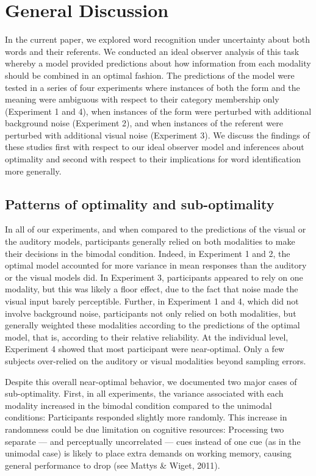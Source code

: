 \documentclass[english,,man,floatsintext]{apa6}
\theoremstyle{definition}
\theoremstyle{definition}
\theoremstyle{definition}
\theoremstyle{remark}
\begin{document}
\section{General Discussion}\label{general-discussion}

In the current paper, we explored word recognition under uncertainty
about both words and their referents. We conducted an ideal observer
analysis of this task whereby a model provided predictions about how
information from each modality should be combined in an optimal fashion.
The predictions of the model were tested in a series of four experiments
where instances of both the form and the meaning were ambiguous with
respect to their category membership only (Experiment 1 and 4), when
instances of the form were perturbed with additional background noise
(Experiment 2), and when instances of the referent were perturbed with
additional visual noise (Experiment 3). We discuss the findings of these
studies first with respect to our ideal observer model and inferences
about optimality and second with respect to their implications for word
identification more generally.

\subsection{Patterns of optimality and
sub-optimality}\label{patterns-of-optimality-and-sub-optimality}

In all of our experiments, and when compared to the predictions of the
visual or the auditory models, participants generally relied on both
modalities to make their decisions in the bimodal condition. Indeed, in
Experiment 1 and 2, the optimal model accounted for more variance in
mean responses than the auditory or the visual models did. In Experiment
3, participants appeared to rely on one modality, but this was likely a
floor effect, due to the fact that noise made the visual input barely
perceptible. Further, in Experiment 1 and 4, which did not involve
background noise, participants not only relied on both modalities, but
generally weighted these modalities according to the predictions of the
optimal model, that is, according to their relative reliability. At the
individual level, Experiment 4 showed that most participant were
near-optimal. Only a few subjects over-relied on the auditory or visual
modalities beyond sampling errors.

Despite this overall near-optimal behavior, we documented two major
cases of sub-optimality. First, in all experiments, the variance
associated with each modality increased in the bimodal condition
compared to the unimodal conditions: Participants responded slightly
more randomly. This increase in randomness could be due limitation on
cognitive resources: Processing two separate --- and perceptually
uncorrelated --- cues instead of one cue (as in the unimodal case) is
likely to place extra demands on working memory, causing general
performance to drop (see Mattys \& Wiget, 2011).
\end{document}
